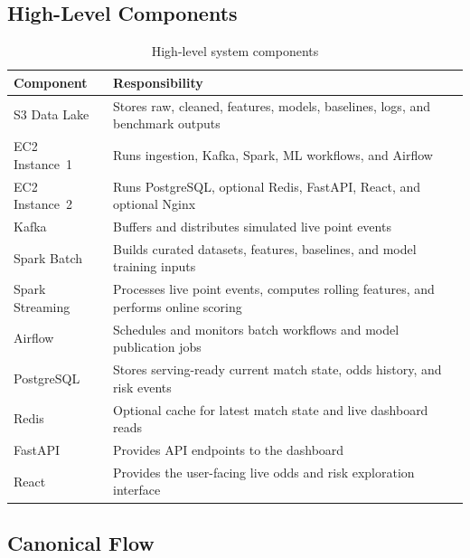 \documentclass[11pt,a4paper]{article}
\begin{document}
\subsection{High-Level Components}

\begin{table}[H]
\centering
\begin{tabularx}{\linewidth}{L{3.5cm}X}
\toprule
\textbf{Component} & \textbf{Responsibility} \\
\midrule
S3 Data Lake & Stores raw, cleaned, features, models, baselines, logs, and benchmark outputs \\
EC2 Instance~1 & Runs ingestion, Kafka, Spark, ML workflows, and Airflow \\
EC2 Instance~2 & Runs PostgreSQL, optional Redis, FastAPI, React, and optional Nginx \\
Kafka & Buffers and distributes simulated live point events \\
Spark Batch & Builds curated datasets, features, baselines, and model training inputs \\
Spark Streaming & Processes live point events, computes rolling features, and performs online scoring \\
Airflow & Schedules and monitors batch workflows and model publication jobs \\
PostgreSQL & Stores serving-ready current match state, odds history, and risk events \\
Redis & Optional cache for latest match state and live dashboard reads \\
FastAPI & Provides API endpoints to the dashboard \\
React & Provides the user-facing live odds and risk exploration interface \\
\bottomrule
\end{tabularx}
\caption{High-level system components}
\end{table}

\subsection{Canonical Flow}
\end{document}
